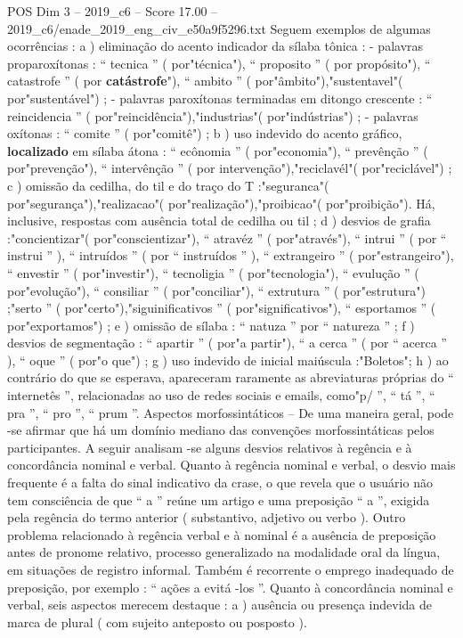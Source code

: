 \begin{textsample}{POS Dim 3 – 2019\_c6 – Score 17.00 – 2019\_c6/enade\_2019\_eng\_civ\_e50a9f5296.txt}
Seguem exemplos de algumas ocorrências : a ) eliminação do acento indicador da sílaba tônica : - palavras proparoxítonas : “ tecnica ” ( por"técnica"), “ proposito ” ( por propósito"), “ catastrofe ” ( por \textbf{catástrofe}"), “ ambito ” ( por"âmbito"),"sustentavel"( por"sustentável") ; - palavras paroxítonas terminadas em ditongo crescente : “ reincidencia ” ( por"reincidência"),"industrias"( por"indústrias") ; - palavras oxítonas : “ comite ” ( por"comitê") ; b ) uso indevido do acento gráfico, \textbf{localizado} em sílaba átona : “ ecônomia ” ( por"economia"), “ prevênção ” ( por"prevenção"), “ intervênção ” ( por intervenção"),"reciclavél"( por"reciclável") ; c ) omissão da cedilha, do til e do traço do T :"seguranca"( por"segurança"),"realizacao"( por"realização"),"proibicao"( por"proibição").
Há, inclusive, respostas com ausência total de cedilha ou til ; d ) desvios de grafia :"concientizar"( por"conscientizar"), “ atravéz ” ( por"através"), “ intrui ” ( por “ instrui ” ), “ intruídos ” ( por “ instruídos ” ), “ extrangeiro ” ( por"estrangeiro"), “ envestir ” ( por"investir"), “ tecnoligia ” ( por"tecnologia"), “ evulução ” ( por"evolução"), “ consiliar ” ( por"conciliar"), “ extrutura ” ( por"estrutura") ;"serto ” ( por"certo"),"siguinificativos ” ( por"significativos"), “ esportamos ” ( por"exportamos") ; e ) omissão de sílaba : “ natuza ” por “ natureza ” ; f ) desvios de segmentação : “ apartir ” ( por"a partir"), “ a cerca ” ( por “ acerca ” ), “ oque ” ( por"o que") ; g ) uso indevido de inicial maiúscula :"Boletos"; h ) ao contrário do que se esperava, apareceram raramente as abreviaturas próprias do “ internetês ”, relacionadas ao uso de redes sociais e emails, como"p/ ”, “ tá ”, “ pra ”, “ pro ”, “ prum ”.
Aspectos morfossintáticos – De uma maneira geral, pode -se afirmar que há um domínio mediano das convenções morfossintáticas pelos participantes.
A seguir analisam -se alguns desvios relativos à regência e à concordância nominal e verbal.
Quanto à regência nominal e verbal, o desvio mais frequente é a falta do sinal indicativo da crase, o que revela que o usuário não tem consciência de que “ a ” reúne um artigo e uma preposição “ a ”, exigida pela regência do termo anterior ( substantivo, adjetivo ou verbo ).
Outro problema relacionado à regência verbal e à nominal é a ausência de preposição antes de pronome relativo, processo generalizado na modalidade oral da língua, em situações de registro informal.
Também é recorrente o emprego inadequado de preposição, por exemplo : “ ações a evitá -los ”.
Quanto à concordância nominal e verbal, seis aspectos merecem destaque : a ) ausência ou presença indevida de marca de plural ( com sujeito anteposto ou posposto ).

\end{textsample}
